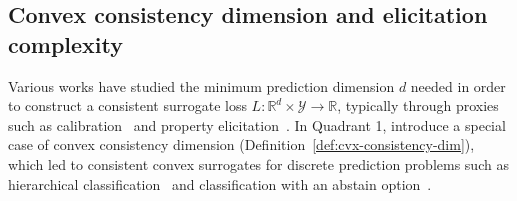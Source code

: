 \documentclass[11pt]{article} %
\newcommand{\Comments}{1}
\newcommand{\mytodo}[2]{\ifnum\Comments=1%
	\todo[linecolor=#1!80!black,backgroundcolor=#1,bordercolor=#1!80!black]{#2}\fi}
\newcommand{\raft}[1]{\mytodo{green!20!white}{RF: #1}}
\newcommand{\jessiet}[1]{\mytodo{purple!20!white}{JF: #1}}
\newcommand{\btw}[1]{}%
\newcommand{\reals}{\mathbb{R}}
\newcommand{\ccdim}{\mathrm{cc\,dim}}
\newcommand{\Lcvx}{\mathcal{L}^{\mathrm{cvx}}}
\newcommand{\Y}{\mathcal{Y}}
\newtheorem{definition}{Definition}
\begin{document}
\subsection{Convex consistency dimension and elicitation complexity}\label{subsec:complexity}

Various works have studied the minimum prediction dimension $d$ needed in order to construct a consistent surrogate loss $L: \reals^d \times \Y \to \reals$, typically through proxies such as calibration~\citep{steinwart2008support,agarwal2015consistent,ramaswamy2016convex} and property elicitation~\citep{frongillo2015vector-valued,fissler2016higher,frongillo2020elicitation}.
In Quadrant 1, \citet{ramaswamy2016convex} introduce a special case of convex consistency dimension (Definition~\ref{def:cvx-consistency-dim}), which led to consistent convex surrogates for discrete prediction problems such as hierarchical classification~\citep{ramaswamy2015hierarchical} and classification with an abstain option~\citep{ramaswamy2018consistent}.


\end{document}
